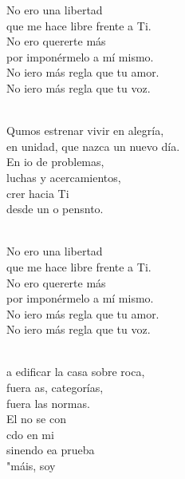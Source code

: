 \documentclass[12pt]{article}
\begin{document}
\begin{multicols*}{2}
\begin{cancion}%
	\begin{chorus}%
	No ero una libertad \\
que me hace libre frente a Ti.\\
	No ero quererte más\\
por imponérmelo a mí mismo.\\
	No iero más regla que tu amor.\\
	No iero más regla que tu voz.\\
	\end{chorus}%
	\jump\\
	Qumos estrenar vivir en alegría,\\
	en unidad, que nazca un nuevo día.\\
	En io de problemas, \\
luchas y acercamientos,\\
	crer hacia Ti  \\
	desde un o pensnto.\\\jump\\
	\begin{chorus}%
	No ero una libertad \\
que me hace libre frente a Ti.\\
	No ero quererte más\\
por imponérmelo a mí mismo.\\
	No iero más regla que tu amor.\\
	No iero más regla que tu voz.\\
	\end{chorus}%
	\jump\\
	a edificar la casa sobre roca,\\
	fuera as, categorías, \\
fuera las normas.\\
	El no se con\\
	cdo en mi \\
	sinendo ea prueba \\
	"máis, soy\\\jump\\

\end{cancion}
\end{multicols*}
\end{document}

